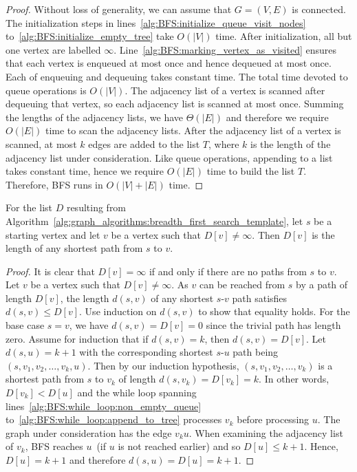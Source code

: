 \begin{proof}
Without loss of generality, we can assume that $G = (V, E)$ is
connected. The initialization steps in
lines~\ref{alg:BFS:initialize_queue_visit_nodes}
to~\ref{alg:BFS:initialize_empty_tree} take $O(|V|)$ time. After
initialization, all but one vertex are labelled
$\infty$. Line~\ref{alg:BFS:marking_vertex_as_visited} ensures that
each vertex is enqueued at most once and hence dequeued at most
once. Each of enqueuing and dequeuing takes constant time. The total
time devoted to queue operations is $O(|V|)$. The adjacency list of a
vertex is scanned after dequeuing that vertex, so each adjacency list
is scanned at most once. Summing the lengths of the adjacency lists,
we have $\Theta(|E|)$ and therefore we require $O(|E|)$ time to scan
the adjacency lists. After the adjacency list of a vertex is scanned,
at most $k$ edges are added to the list $T$, where $k$ is the length
of the adjacency list under consideration. Like queue operations,
appending to a list takes constant time, hence we require $O(|E|)$
time to build the list $T$. Therefore, BFS runs in $O(|V| + |E|)$
time.
\end{proof}

\begin{theorem}
\label{thm:graph_algorithms:BFS:list_D_length_shortest_paths}
For the list $D$ resulting from
Algorithm~\ref{alg:graph_algorithms:breadth_first_search_template},
let $s$ be a starting vertex and let $v$ be a vertex such that
$D[v] \neq \infty$. Then $D[v]$ is the length of any shortest path
from $s$ to $v$.
\end{theorem}

\begin{proof}
It is clear that $D[v] = \infty$ if and only if there are no paths
from $s$ to $v$. Let $v$ be a vertex such that $D[v] \neq \infty$. As
$v$ can be reached from $s$ by a path of length $D[v]$, the length
$d(s,v)$ of any shortest $s$-$v$ path satisfies $d(s,v) \leq
D[v]$. Use induction on $d(s,v)$ to show that equality holds. For the
base case $s = v$, we have $d(s,v) = D[v] = 0$ since the trivial path
has length zero. Assume for induction that if $d(s,v) = k$, then
$d(s,v) = D[v]$.
Let $d(s,u) = k + 1$ with the corresponding shortest $s$-$u$ path
being $(s, v_1, v_2, \dots, v_k, u)$. Then by our induction
hypothesis, $(s, v_1, v_2, \dots, v_k)$ is a shortest path from $s$ to
$v_k$ of length $d(s, v_k) = D[v_k] = k$. In other words, $D[v_k] <
D[u]$ and the while loop spanning
lines~\ref{alg:BFS:while_loop:non_empty_queue}
to~\ref{alg:BFS:while_loop:append_to_tree} processes $v_k$ before
processing $u$. The graph under consideration has the edge $v_k
u$. When examining the adjacency list of $v_k$, BFS reaches $u$~(if
$u$ is not reached earlier) and so $D[u] \leq k + 1$. Hence,
$D[u] = k + 1$ and therefore $d(s,u) = D[u] = k + 1$.
\end{proof}

